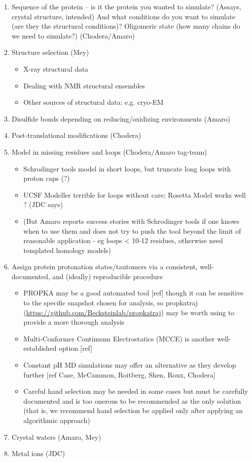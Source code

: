 \documentclass[9pt]{livecoms}
\begin{document}
\begin{enumerate}
\item Sequence of the protein -- is it the protein you wanted to simulate? (Assays, crystal structure, intended) And what conditions do you want to simulate (are they the structural conditions)? Oligomeric state (how many chains do we need to simulate?) (Chodera/Amaro)
\item Structure selection (Mey) 
    \begin{itemize}
    \item  X-ray structural data
    \item Dealing with NMR structural ensembles
    \item Other sources of structural data: e.g. cryo-EM
    \end{itemize}
\item Disulfide bonds depending on reducing/oxidizing environments (Amaro)
\item Post-translational modifications (Chodera)
\item Model in missing residues and loops (Chodera/Amaro tag-team)
    \begin{itemize}
    \item Schrodinger tools model in short loops, but truncate long loops with proton caps (?)
    \item UCSF Modeller terrible for loops without care; Rosetta Model works well ? (JDC says)
    \item (But Amaro reports success stories with Schrodinger tools if one knows when to use them and does not try to push the tool beyond the limit of reasonable application - eg loops < 10-12 residues, otherwise need templated homology models)
    \end{itemize}
\item Assign protein protonation states/tautomers via a consistent, well-documented, and (ideally) reproducible procedure 
    \begin{itemize}
    \item PROPKA may be a good automated tool [ref] though it can be sensitive to the specific snapshot chosen for analysis, so propkatraj (\url{https://github.com/Becksteinlab/propkatraj}) may be worth using to provide a more thorough analysis
    \item Multi-Conformer Continuum Electrostatics (MCCE) is another well-established option [ref] 
    \item Constant pH MD simulations may offer an alternative as they develop further [ref  Case, McCammon, Roitberg, Shen, Roux, Chodera]
    \item Careful hand selection may be needed in some cases but must be carefully documented and is too onerous to be recommended as the only solution (that is, we recommend hand selection be applied only after applying an algorithmic approach)
    \end{itemize}
\item Crystal waters (Amaro, Mey)
\item Metal ions (JDC)


\end{enumerate}
\end{document}
